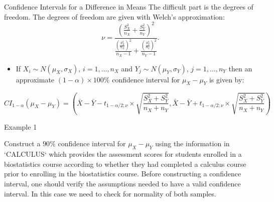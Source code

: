 \documentclass[
  ignorenonframetext,
]{beamer}
\providecommand{\tightlist}{%
  \setlength{\itemsep}{0pt}\setlength{\parskip}{0pt}}
\begin{document}
\begin{frame}{Confidence Intervals for a Difference in Means}
\protect\hypertarget{confidence-intervals-for-a-difference-in-means-1}{}
The difficult part is the degrees of freedom. The degrees of freedom are
given with Welch's approximation:
\[\nu=\frac{\left(\frac{S^2_X}{n_X}+\frac{S^2_Y}{n_Y}\right)^2}{\frac{\left(\frac{S^2_X}{n_X}\right)^2}{n_X-1}+\frac{\left(\frac{S^2_Y}{n_Y}\right)^2}{n_Y-1}}.\]

\begin{itemize}
\tightlist
\item
  If \(X_i\sim N(\mu_X, \sigma_X)\), \(i=1, \ldots, n_X\) and
  \(Y_j\sim N(\mu_Y, \sigma_Y)\), \(j=1, \ldots, n_Y\) then an
  approximate \((1-\alpha)\times 100\%\) confidence interval for
  \(\mu_X-\mu_Y\) is given by:
\end{itemize}

\[\scriptstyle CI_{1-\alpha}(\mu_X-\mu_Y)=\left(\bar{X}-\bar{Y}-t_{1-\alpha/2;\nu}\times \sqrt{\frac{S_X^2+S_Y^2}{n_X+n_Y}},\bar{X}-\bar{Y}+t_{1-\alpha/2;\nu}\times \sqrt{\frac{S_X^2+S_Y^2}{n_X+n_Y}}\right)\]
\end{frame}

\begin{frame}{Example 1}
\protect\hypertarget{example-1}{}
\begin{tcolorbox}
Construct a $90\%$ confidence interval for $\mu_X-\mu_Y$ using the information in `CALCULUS` which provides the assessment scores for students enrolled in a biostatistics course according to whether they had completed a calculus course prior to enrolling in the biostatistics course. Before constructing a confidence interval, one should verify the assumptions needed to have a valid confidence interval. In this case we need to check for normality of both samples.
\end{tcolorbox}
\end{frame}
\end{document}
